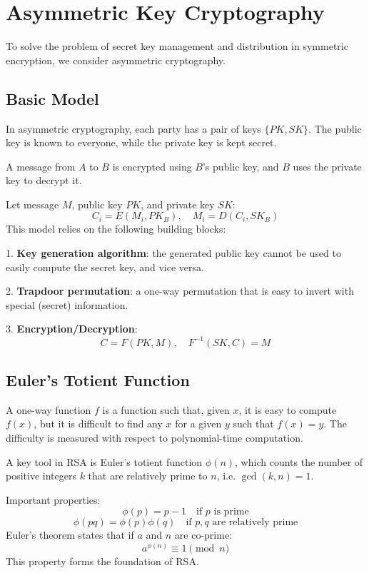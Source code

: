 \section{Asymmetric Key Cryptography}

To solve the problem of secret key management and distribution in symmetric encryption, we consider asymmetric cryptography.

\subsection{Basic Model}
In asymmetric cryptography, each party has a pair of keys \(\{PK, SK\}\). The public key is known to everyone, while the private key is kept secret.

A message from \(A\) to \(B\) is encrypted using \(B\)'s public key, and \(B\) uses the private key to decrypt it.

Let message \(M\), public key \(PK\), and private key \(SK\):
\[
  C_i = E(M_i, PK_B), \quad M_i = D(C_i, SK_B)
\]
This model relies on the following building blocks:

1. \textbf{Key generation algorithm}: the generated public key cannot be used to easily compute the secret key, and vice versa.

2. \textbf{Trapdoor permutation}: a one-way permutation that is easy to invert with special (secret) information.

3. \textbf{Encryption/Decryption}:
\[
  C = F(PK, M), \quad F^{-1}(SK, C) = M
\]

\subsection{Euler's Totient Function}
A one-way function \(f\) is a function such that, given \(x\), it is easy to compute \(f(x)\), but it is difficult to find any \(x\) for a given \(y\) such that \(f(x) = y\). The difficulty is measured with respect to polynomial-time computation.

A key tool in RSA is Euler's totient function \(\phi(n)\), which counts the number of positive integers \(k\) that are relatively prime to \(n\), i.e. \(\gcd(k, n) = 1\).

Important properties:
\[
  \phi(p) = p - 1 \quad \text{if } p \text{ is prime}
\]
\[
  \phi(pq) = \phi(p)\phi(q) \quad \text{if } p, q \text{ are relatively prime}
\]
Euler's theorem states that if \(a\) and \(n\) are co-prime:
\[
  a^{\phi(n)} \equiv 1 \pmod{n}
\]
This property forms the foundation of RSA.

